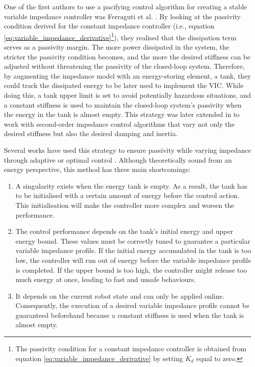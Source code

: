 One of the first authors to use a pacifying control algorithm for creating a stable variable impedance controller was Ferraguti et al. \cite{ferragutiTankbasedApproachImpedance2013}. By looking at the passivity condition derived for the constant impedance controller (i.e., equation \eqref{eq:variable_impedance_derivative}\footnote{The passivity condition for a constant impedance controller is obtained from equation \eqref{eq:variable_impedance_derivative} by setting $\dot{K}_d$ equal to zero.}), they realised that the dissipation term serves as a passivity margin. The more power dissipated in the system, the stricter the passivity condition becomes, and the more the desired stiffness can be adjusted without threatening the passivity of the closed-loop system. Therefore, by augmenting the impedance model with an energy-storing element, a tank, they could track the dissipated energy to be later used to implement the VIC. While doing this, a tank upper limit is set to avoid potentially hazardous situations, and a constant stiffness is used to maintain the closed-loop system's passivity when the energy in the tank is almost empty. This strategy was later extended in \cite{ferragutiEnergyTankBasedInteractive2015} to work with second-order impedance control algorithms that vary not only the desired stiffness but also the desired damping and inertia.

Several works have used this strategy to ensure passivity while varying impedance through adaptive or optimal control \cite{cordoniVariableStochasticAdmittance2020,dietrichPassivationProjectionBasedNull2016,dietrichPassiveHierarchicalImpedance2017,michelPassivitybasedVariableImpedance2020,chenDrawingElonMusk2021,balattiMethodAutonomousRobotic2020,scibiliaSelfAdaptiveRobotControl2018,selvaggioPassiveVirtualFixtures2018,tadeleCombiningEnergyPower2014,karacanPassivityBasedSkillMotion2022}. Although theoretically sound from an energy perspective, this method has three main shortcomings:
\begin{enumerate}
    \item A singularity exists when the energy tank is empty. As a result, the tank has to be initialised with a certain amount of energy before the control action. This initialisation will make the controller more complex and worsen the performance.
    \item The control performance depends on the tank's initial energy and upper energy bound. These values must be correctly tuned to guarantee a particular variable impedance profile. If the initial energy accumulated in the tank is too low, the controller will run out of energy before the variable impedance profile is completed. If the upper bound is too high, the controller might release too much energy at once, leading to fast and unsafe behaviours.
    \item It depends on the current robot state and can only be applied online. Consequently, the execution of a desired variable impedance profile cannot be guaranteed beforehand because a constant stiffness is used when the tank is almost empty.
\end{enumerate}

